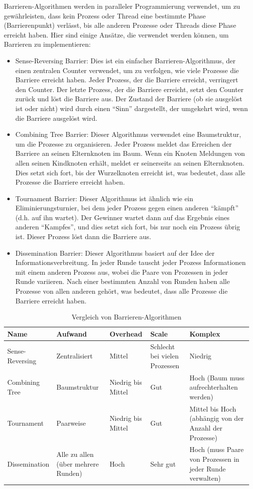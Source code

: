 Barrieren-Algorithmen werden in paralleler Programmierung verwendet, um zu gewährleisten, dass kein Prozess oder Thread eine bestimmte Phase (Barrierenpunkt) verlässt, bis alle anderen Prozesse oder Threads diese Phase erreicht haben. Hier sind einige Ansätze, die verwendet werden können, um Barrieren zu implementieren:
\begin{itemize}
\item Sense-Reversing Barrier: Dies ist ein einfacher Barrieren-Algorithmus, der einen zentralen Counter verwendet, um zu verfolgen, wie viele Prozesse die Barriere erreicht haben. Jeder Prozess, der die Barriere erreicht, verringert den Counter. Der letzte Prozess, der die Barriere erreicht, setzt den Counter zurück und löst die Barriere aus. Der Zustand der Barriere (ob sie ausgelöst ist oder nicht) wird durch einen \enquote{Sinn} dargestellt, der umgekehrt wird, wenn die Barriere ausgelöst wird.
\item Combining Tree Barrier: Dieser Algorithmus verwendet eine Baumstruktur, um die Prozesse zu organisieren. Jeder Prozess meldet das Erreichen der Barriere an seinen Elternknoten im Baum. Wenn ein Knoten Meldungen von allen seinen Kindknoten erhält, meldet er seinerseits an seinen Elternknoten. Dies setzt sich fort, bis der Wurzelknoten erreicht ist, was bedeutet, dass alle Prozesse die Barriere erreicht haben.
\item Tournament Barrier: Dieser Algorithmus ist ähnlich wie ein Eliminierungsturnier, bei dem jeder Prozess gegen einen anderen \enquote{kämpft} (d.h. auf ihn wartet). Der Gewinner wartet dann auf das Ergebnis eines anderen \enquote{Kampfes}, und dies setzt sich fort, bis nur noch ein Prozess übrig ist. Dieser Prozess löst dann die Barriere aus.
\item Dissemination Barrier: Dieser Algorithmus basiert auf der Idee der Informationsverbreitung. In jeder Runde tauscht jeder Prozess Informationen mit einem anderen Prozess aus, wobei die Paare von Prozessen in jeder Runde variieren. Nach einer bestimmten Anzahl von Runden haben alle Prozesse von allen anderen gehört, was bedeutet, dass alle Prozesse die Barriere erreicht haben.
\end{itemize}

\begin{table}
\centering
\begin{tabularx}{\textwidth}{|X|X|X|X|X|}
\hline
\textbf{Name} & \textbf{Aufwand} & \textbf{Overhead} & \textbf{Scale} & \textbf{Komplex} \\ 
\hline
Sense-Reversing & Zentralisiert & Mittel & Schlecht bei vielen Prozessen & Niedrig \\ 
\hline
Combining Tree & Baumstruktur & Niedrig bis Mittel & Gut & Hoch (Baum muss aufrechterhalten werden) \\ 
\hline
Tournament & Paarweise & Niedrig bis Mittel & Gut & Mittel bis Hoch (abhängig von der Anzahl der Prozesse) \\ 
\hline
Dissemination & Alle zu allen (über mehrere Runden) & Hoch & Sehr gut & Hoch (muss Paare von Prozessen in jeder Runde verwalten) \\ 
\hline
\end{tabularx}
\caption{Vergleich von Barrieren-Algorithmen}
\end{table}

